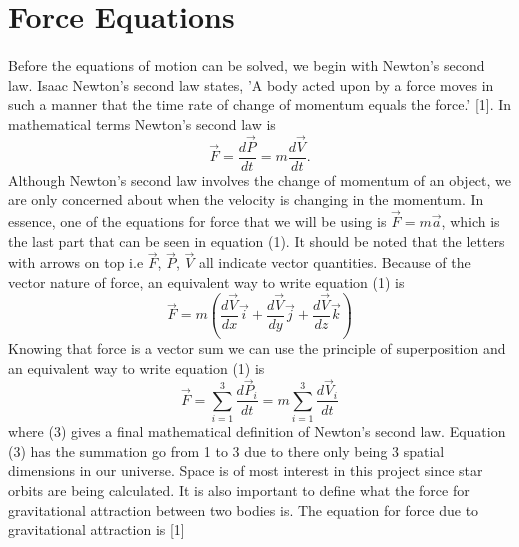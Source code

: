 \documentclass[]{article}
\begin{document}
\section{Force Equations}
\begin{multicols}{2}
\paragraph{}
\setlength{\parskip}{1em}
Before the equations of motion can be solved, we begin with Newton's second law. Isaac Newton's second law states, 'A body acted upon by a force moves in such a manner that the time rate of change of momentum equals the force.' [1]. In mathematical terms Newton's second law is
\begin{equation}\label{1}
\Vec{F}=\frac{d\Vec{P}}{dt}=m\frac{d\Vec{V}}{dt}.
\end{equation}
Although Newton's second law involves the change of momentum of an object, we are only concerned about when the velocity is changing in the momentum. In essence, one of the equations for force that we will be using is $\Vec{F}=m\Vec{a}$, which is the last part that can be seen in equation (1). It should be noted that the letters with arrows on top i.e $\Vec{F}$, $\Vec{P}$, $\Vec{V}$ all indicate vector quantities. Because of the vector nature of force, an equivalent way to write equation (1) is
\begin{equation}\label{2}
\Vec{F}=m(\frac{d\Vec{V}}{dx}\Vec{i} + \frac{d\Vec{V}}{dy}\Vec{j} + \frac{d\Vec{V}}{dz}\Vec{k})
\end{equation}
Knowing that force is a vector sum we can use the principle of superposition and an equivalent way to write equation (1) is
\begin{equation}\label{3}
\Vec{F}=\sum_{i=1}^{3} \frac{d\Vec{P}_i}{dt}=m\sum_{i=1}^{3} \frac{d\Vec{V}_i}{dt}
\end{equation}
where (3) gives a final mathematical definition of Newton's second law. Equation (3) has the summation go from 1 to 3 due to there only being 3 spatial dimensions in our universe. Space is of most interest in this project since star orbits are being calculated. It is also important to define what the force for gravitational attraction between two bodies is. The equation for force due to gravitational attraction is [1]
\begin{equation}\label{4}

\end{equation}
\end{multicols}
\end{document}

